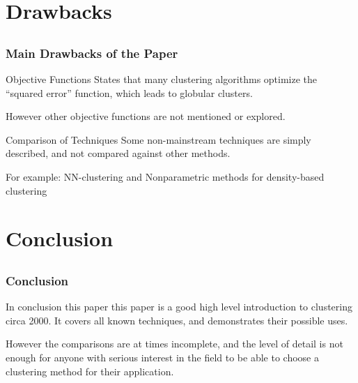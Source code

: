 \documentclass{beamer}
\begin{document}
\section{Drawbacks}
    \subsection{}
        \frame
        {
            \frametitle{Main Drawbacks of the Paper}
            \begin{block}{Objective Functions}
                States that many clustering algorithms optimize the ``squared error'' function, which leads to globular clusters. 
                
                However other objective functions are not mentioned or explored.
            \end{block}
            \pause
            \begin{alertblock}{Comparison of Techniques}
                Some non-mainstream techniques are simply described, and not compared against other methods.
                
                For example: NN-clustering and Nonparametric methods for density-based clustering
            \end{alertblock}
        }
\section{Conclusion}
    \subsection{}
        \frame
        {
            \frametitle{Conclusion}
            In conclusion this paper this paper is a good high level introduction to clustering circa 2000. It covers all known techniques, and demonstrates their possible uses.

            However the comparisons are at times incomplete, and the level of detail is not enough for anyone with serious interest in the field to be able to choose a clustering method for their application.
        }
\end{document}
